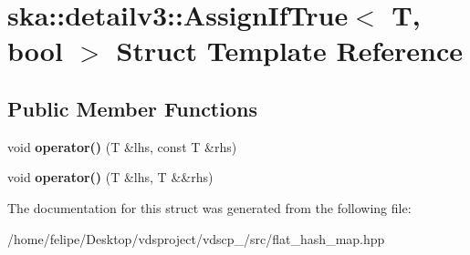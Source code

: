 \section{ska\+:\+:detailv3\+:\+:Assign\+If\+True$<$ T, bool $>$ Struct Template Reference}
\label{structska_1_1detailv3_1_1AssignIfTrue}
\subsection*{Public Member Functions}
\begin{DoxyCompactItemize}
\item 
void {\bfseries operator()} (T \&lhs, const T \&rhs)\label{structska_1_1detailv3_1_1AssignIfTrue_a90698a1824a2e75e9de26a28dfdf063f}

\item 
void {\bfseries operator()} (T \&lhs, T \&\&rhs)\label{structska_1_1detailv3_1_1AssignIfTrue_a38154d29b7ae49efca8cb15cf24838df}

\end{DoxyCompactItemize}


The documentation for this struct was generated from the following file\+:\begin{DoxyCompactItemize}
\item 
/home/felipe/\+Desktop/vdsproject/vdscp\+\_/src/flat\+\_\+hash\+\_\+map.\+hpp\end{DoxyCompactItemize}
